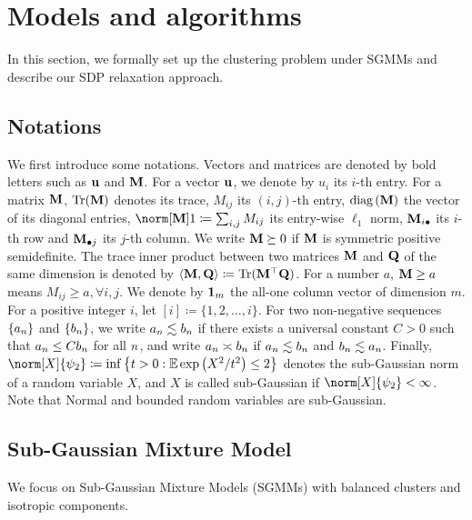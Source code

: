 
\section{Models and algorithms\label{sec:setup}}

In this section, we formally set up the clustering problem under SGMMs
and describe our SDP relaxation approach.

\subsection{Notations}

We first introduce some notations. Vectors and matrices are denoted
by bold letters such as $\mathbf{\mathbf{u}}$ and $\mathbf{M}$. For a vector $\mathbf{u}$,
we denote by $u_{i}$ its $i$-th entry. For a matrix $\mathbf{M}$, $\operatorname*{Tr}(\mathbf{M})$
denotes its trace, $M_{ij}$ its $(i,j)$-th entry, $\mbox{diag}\left(\mathbf{M}\right)$
the vector of its diagonal entries, $\norm[\M]1\coloneqq\sum_{i,j}M_{ij}$
its entry-wise $\ell_{1}$ norm, $\mathbf{M}_{i\bullet}$ its $i$-th row
and $\mathbf{M}_{\bullet j}$ its $j$-th column. We write $\mathbf{M}\succeq0$ if
$\mathbf{M}$ is symmetric positive semidefinite. The trace inner product
between two matrices $\mathbf{M}$ and $\mathbf{Q}$ of the same dimension is denoted
by $\left\langle \mathbf{M},\mathbf{Q}\right\rangle \coloneqq\operatorname*{Tr}(\mathbf{M}^{\top}\mathbf{Q})$. For
a number $a$, $\mathbf{M}\geq a$ means $M_{ij}\geq a,\forall i,j$. We denote
by $\mathbf{1}_{m}$ the all-one column vector of dimension $m$. For
a positive integer $i$, let $[i]\coloneqq\{1,2,\ldots,i\}$.  For
two non-negative sequences $\{a_{n}\}$ and $\{b_{n}\}$, we
write $a_{n}\lesssim b_{n}$ if there exists a universal constant
$C>0$ such that $a_{n}\le Cb_{n}$ for all $n$, and write
$a_{n}\asymp b_{n}$ if $a_{n}\lesssim b_{n}$ and $b_{n}\lesssim a_{n}$.
Finally, $\norm[X]{\psi_{2}}\coloneqq\inf\left\{ t>0:\E\exp\left(X^{2}/t^{2}\right)\le2\right\} $
denotes the sub-Gaussian norm of a random variable $X$, and $X$
is called sub-Gaussian if $\norm[X]{\psi_{2}}<\infty$. Note that
Normal and bounded random variables are sub-Gaussian. 

\subsection{Sub-Gaussian Mixture Model \label{sec:setup_model}}

We focus on Sub-Gaussian Mixture Models (SGMMs) with balanced clusters
and isotropic components.

